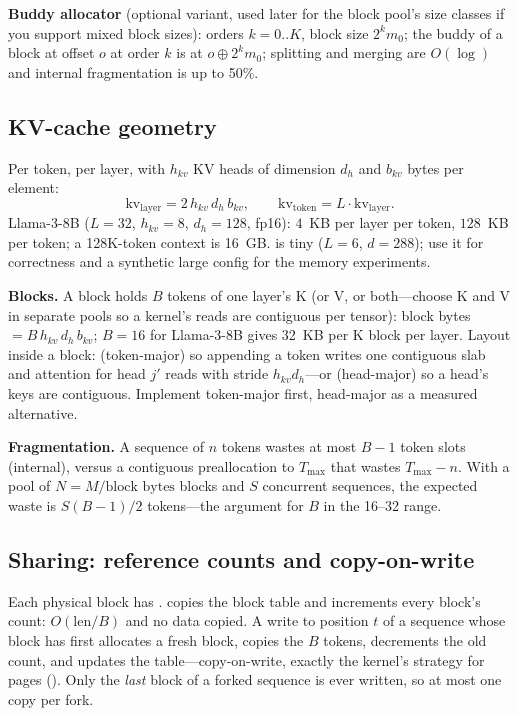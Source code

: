 \textbf{Buddy allocator} (optional variant, used later for the block pool's size classes if you support mixed block sizes): orders $k = 0..K$, block size $2^k m_0$; the buddy of a block at offset $o$ at order $k$ is at $o \oplus 2^k m_0$; splitting and merging are $O(\log)$ and internal fragmentation is up to 50\%.

\subsection{KV-cache geometry}

Per token, per layer, with $h_{kv}$ KV heads of dimension $d_h$ and $b_{kv}$ bytes per element:
\begin{equation}
\text{kv}_{\text{layer}} = 2\,h_{kv}\,d_h\,b_{kv},\qquad \text{kv}_{\text{token}} = L\cdot \text{kv}_{\text{layer}}.
\end{equation}
Llama-3-8B ($L=32$, $h_{kv}=8$, $d_h=128$, fp16): $4$~KB per layer per token, $128$~KB per token; a 128K-token context is 16~GB.  is tiny ($L=6$, $d=288$); use it for correctness and a synthetic large config for the memory experiments.

\textbf{Blocks.} A block holds $B$ tokens of one layer's K (or V, or both---choose K and V in separate pools so a kernel's reads are contiguous per tensor): block bytes $= B\,h_{kv}\,d_h\,b_{kv}$; $B=16$ for Llama-3-8B gives 32~KB per K block per layer. Layout inside a block: \code{[B][h\_kv][d\_h]} (token-major) so appending a token writes one contiguous slab and attention for head $j'$ reads with stride $h_{kv}d_h$---or \code{[h\_kv][B][d\_h]} (head-major) so a head's keys are contiguous. Implement token-major first, head-major as a measured alternative.

\textbf{Fragmentation.} A sequence of $n$ tokens wastes at most $B-1$ token slots (internal), versus a contiguous preallocation to $T_{\max}$ that wastes $T_{\max}-n$. With a pool of $N = M/\text{block bytes}$ blocks and $S$ concurrent sequences, the expected waste is $S(B-1)/2$ tokens---the argument for $B$ in the 16--32 range.

\subsection{Sharing: reference counts and copy-on-write}

Each physical block has .  copies the block table and increments every block's count: $O(\text{len}/B)$ and no data copied. A write to position $t$ of a sequence whose block has  first allocates a fresh block, copies the $B$ tokens, decrements the old count, and updates the table---copy-on-write, exactly the kernel's  strategy for pages (). Only the \emph{last} block of a forked sequence is ever written, so at most one copy per fork.

